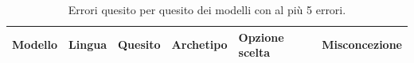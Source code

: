 \begin{table}[htbp]
\centering\small
\begin{tabularx}{\textwidth}{lXXXXX}
\toprule
Modello & Lingua & Quesito & Archetipo & Opzione scelta & Misconcezione \\
\midrule
\bottomrule
\end{tabularx}
\caption{Errori quesito per quesito dei modelli con al più 5 errori.}
\label{tab:errori-quesiti}
\end{table}
